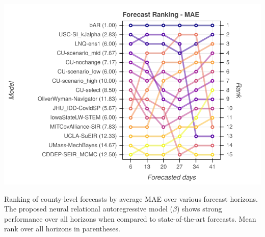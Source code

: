 \documentclass[nobib]{tufte-handout}
\newcommand{\bAR}{\ensuremath{\beta}\text{-AR}\xspace}
\begin{document}
\begin{marginfigure}[-45em]
\hspace{-2.5em}%
\includegraphics[width=1.3\columnwidth]{img/us_rank_mae.png}
\caption{Ranking of county-level forecasts by average MAE over various forecast horizons. The proposed neural relational autoregressive model (\bAR) shows strong performance over all horizons when compared to state-of-the-art forecasts. Mean rank over all horizons in parentheses.}
\label{fig:ranking-covidhub-mae}
\end{marginfigure}
\end{document}
